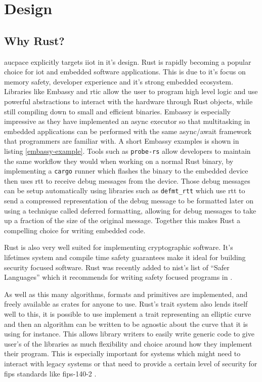 \chapter{Design}
\label{chap:design}

\section{Why Rust?}
\label{sec:why-rust}

\gls{aucpace} explicitly targets \gls{iiot} in it's design.
Rust is rapidly becoming a popular choice for \gls{iot} and embedded software applications.
This is due to it's focus on memory safety, developer experience and it's strong embedded ecosystem.
Libraries like Embassy and \gls{rtic} allow the user to program high level logic and use powerful abstractions to interact with the hardware through Rust objects, while still compiling down to small and efficient binaries.
Embassy is especially impressive as they have implemented an async executor so that multitasking in embedded applications can be performed with the same async/await framework that programmers are familiar with.
A short Embassy examples is shown in listing \ref{embassy-example}.
Tools such as \texttt{probe-rs} allow developers to maintain the same workflow they would when working on a normal Rust binary, by implementing a \texttt{cargo} runner which flashes the binary to the embedded device then uses \gls{rtt} to receive debug messages from the device.
Those debug messages can be setup automatically using libraries such as \texttt{defmt\_rtt} which use \gls{rtt} to send a compressed representation of the debug message to be formatted later on using a technique called deferred formatting, allowing for debug messages to take up a fraction of the size of the original message.
Together this makes Rust a compelling choice for writing embedded code.

\medskip{}


Rust is also very well suited for implementing cryptographic software.
It's lifetimes system and compile time safety guarantees make it ideal for building security focused software.
Rust was recently added to \gls{nist}'s list of \enquote{Safer Languages} which it recommends for writing safety focused programs in \cite{nist-safer-languages}.

As well as this many algorithms, formats and primitives are implemented, and freely available as crates for anyone to use.
Rust's trait system also lends itself well to this, it is possible to use implement a trait representing an elliptic curve and then an algorithm can be written to be agnostic about the curve that it is using for instance.
This allows library writers to easily write generic code to give user's of the libraries as much flexibility and choice around how they implement their program.
This is especially important for systems which might need to interact with legacy systems or that need to provide a certain level of security for \gls{fips} standards like \gls{fips}-140-2 \cite{fips-140-2}.

